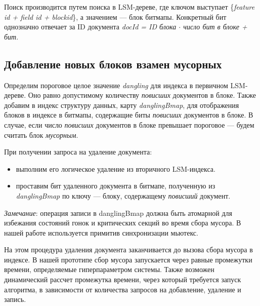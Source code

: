 Поиск производится путем поиска в LSM-дереве, где ключом выступает
\{\textit{feature id + field id + blockid}\}, а значением — блок битмапы.
Конкретный бит однозначно отвечает за ID документа \textit{docId = ID блока
$\cdot$ число бит в блоке + бит}.

\subsection{Добавление новых блоков взамен мусорных}

Определим пороговое целое значение \textit{dangling} для индекса в первичном
LSM-дереве. Оно равно допустимому количеству \textit{повисших} документов в
блоке. Также добавим в индекс структуру данных, карту \textit{danglingBmap}, для
отображения блоков в индексе в битмапы, содержащие биты \textit{повисших}
документов в блоке. В случае, если число \textit{повисших} документов в блоке
превышает пороговое — будем считать блок \textit{мусорным}.

При получении запроса на удаление документа:
\begin{itemize}
    \item выполним его логическое удаление из вторичного LSM-индекса.
    \item проставим бит удаленного документа в битмапе, полученную из
    \textit{danglingBmap} по ключу — блоку, содержащему \textit{повисший} документ.
\end{itemize}

\textit{Замечание}: операция записи в danglingBmap должна быть атомарной для 
избежания состояний гонок и критических секций во время сбора мусора. В нашей
работе используется примитив синхронизации мьютекс.

На этом процедура удаления документа заканчивается до вызова сбора мусора в индексе.
В нашей прототипе сбор мусора запускается через равные промежутки времени, определяемые 
гиперпараметром системы. Также возможен динамический рассчет промежутка времени,
через который требуется запуск алгоритма, в зависимости от количества запросов на
добавление, удаление и запись.

